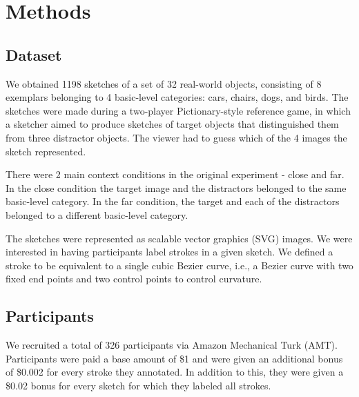 \documentclass[10pt,letterpaper]{article}
\newcommand{\jefan}[1]{{\color{blue}{[jefan: #1]}}}
\begin{document}
\section{Methods}

\subsection{Dataset}

\jefan{Great start! I strongly recommend re-organizing this section. First paragraph should set up criteria our dataset should satisfy (i.e., contain sketches produced in different contexts), and where that dataset came from (i.e., a reference game experiment with the close/far manipulation). Second paragraph should describe properties of the dataset (i.e., how many sketches, how strokes relate to sketches, how sub-stroke elements relate to strokes.)}

We obtained 1198 sketches of a set of 32 real-world objects, consisting of 8 exemplars belonging to 4 basic-level categories: cars, chairs, dogs, and birds. 
The sketches were made during a two-player Pictionary-style reference game, in which a sketcher aimed to produce sketches of target objects that distinguished them from three distractor objects. 
The viewer had to guess which of the 4 images the sketch represented.

There were 2 main context conditions in the original experiment - close and far. 
In the close condition the target image and the distractors belonged to the same basic-level category. 
In the far condition, the target and each of the distractors belonged to a different basic-level category.

The sketches were represented as scalable vector graphics (SVG) images. 
We were interested in having participants label strokes in a given sketch. 
We defined a stroke to be equivalent to a single cubic Bezier curve, i.e., a Bezier curve with two fixed end points and two control points to control curvature. \jefan{Is this right? Each stroke consisted of multiple Bezier curves, no?}

\subsection{Participants}

We recruited a total of 326 participants via Amazon Mechanical Turk (AMT). \jefan{Should add sentence about providing informed consent and adhering to Stanford IRB -- see other papers for example.}
Participants were paid a base amount of \$1 and were given an additional bonus of \$0.002 for every stroke they annotated. \jefan{Correction: base amount was \$0.35.}
In addition to this, they were given a \$0.02 bonus for every sketch for which they labeled all strokes. 
\end{document}
